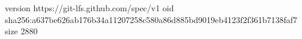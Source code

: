 version https://git-lfs.github.com/spec/v1
oid sha256:a637be626ab176b34a11207258c580a86d885bd9019eb4123f2f361b7138faf7
size 2880
